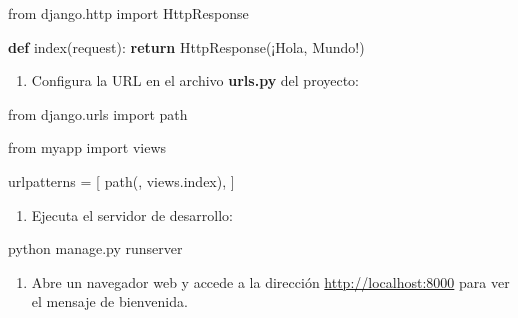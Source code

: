 \documentclass[
  a4paper,
  DIV=11,
  numbers=noendperiod,
  onepage,
  openany]{scrreprt}
\newenvironment{Shaded}{\begin{snugshade}}{\end{snugshade}}
\newcommand{\ControlFlowTok}[1]{\textcolor[rgb]{0.00,0.23,0.31}{\textbf{#1}}}
\newcommand{\ExtensionTok}[1]{\textcolor[rgb]{0.00,0.23,0.31}{#1}}
\newcommand{\ImportTok}[1]{\textcolor[rgb]{0.00,0.46,0.62}{#1}}
\newcommand{\KeywordTok}[1]{\textcolor[rgb]{0.00,0.23,0.31}{\textbf{#1}}}
\newcommand{\NormalTok}[1]{\textcolor[rgb]{0.00,0.23,0.31}{#1}}
\newcommand{\OperatorTok}[1]{\textcolor[rgb]{0.37,0.37,0.37}{#1}}
\newcommand{\StringTok}[1]{\textcolor[rgb]{0.13,0.47,0.30}{#1}}
\providecommand{\tightlist}{%
  \setlength{\itemsep}{0pt}\setlength{\parskip}{0pt}}\usepackage{longtable,booktabs,array}
\begin{document}
\begin{Shaded}
\begin{Highlighting}[]
\ImportTok{from}\NormalTok{ django.http }\ImportTok{import}\NormalTok{ HttpResponse}

\KeywordTok{def}\NormalTok{ index(request):}
    \ControlFlowTok{return}\NormalTok{ HttpResponse(}\StringTok{\textquotesingle{}¡Hola, Mundo!\textquotesingle{}}\NormalTok{)}
\end{Highlighting}
\end{Shaded}

\begin{enumerate}
\def\labelenumi{\arabic{enumi}.}
\setcounter{enumi}{4}
\tightlist
\item
  Configura la URL en el archivo \textbf{urls.py} del proyecto:
\end{enumerate}

\begin{Shaded}
\begin{Highlighting}[]
\ImportTok{from}\NormalTok{ django.urls }\ImportTok{import}\NormalTok{ path}

\ImportTok{from}\NormalTok{ myapp }\ImportTok{import}\NormalTok{ views}

\NormalTok{urlpatterns }\OperatorTok{=}\NormalTok{ [}
\NormalTok{    path(}\StringTok{\textquotesingle{}\textquotesingle{}}\NormalTok{, views.index),}
\NormalTok{]}
\end{Highlighting}
\end{Shaded}

\begin{enumerate}
\def\labelenumi{\arabic{enumi}.}
\setcounter{enumi}{5}
\tightlist
\item
  Ejecuta el servidor de desarrollo:
\end{enumerate}

\begin{Shaded}
\begin{Highlighting}[]
\ExtensionTok{python}\NormalTok{ manage.py runserver}
\end{Highlighting}
\end{Shaded}

\begin{enumerate}
\def\labelenumi{\arabic{enumi}.}
\setcounter{enumi}{6}
\tightlist
\item
  Abre un navegador web y accede a la dirección
  \url{http://localhost:8000} para ver el mensaje de bienvenida.
\end{enumerate}
\end{document}
